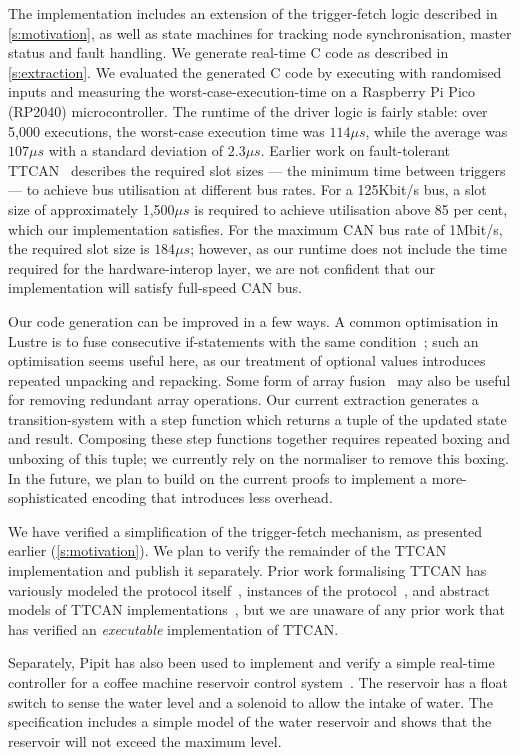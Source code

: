 The implementation includes an extension of the trigger-fetch logic described in \autoref{s:motivation}, as well as state machines for tracking node synchronisation, master status and fault handling.
We generate real-time C code as described in \autoref{s:extraction}.
We evaluated the generated C code by executing with randomised inputs and measuring the worst-case-execution-time on a Raspberry Pi Pico (RP2040) microcontroller.
The runtime of the driver logic is fairly stable: over 5,000 executions, the worst-case execution time was $114\mu{}s$, while the average was $107\mu{}s$ with a standard deviation of $2.3\mu{}s$.
Earlier work on fault-tolerant TTCAN~\cite{short2007fault} describes the required slot sizes --- the minimum time between triggers --- to achieve bus utilisation at different bus rates.
For a 125Kbit/s bus, a slot size of approximately 1,500$\mu{}s$ is required to achieve utilisation above 85 per cent, which our implementation satisfies.
For the maximum CAN bus rate of 1Mbit/s, the required slot size is $184\mu{}s$; however, as our runtime does not include the time required for the hardware-interop layer, we are not confident that our implementation will satisfy full-speed CAN bus.

Our code generation can be improved in a few ways.
A common optimisation in Lustre is to fuse consecutive if-statements with the same condition~\cite{bourke2017formally}; such an optimisation seems useful here, as our treatment of optional values introduces repeated unpacking and repacking.
Some form of array fusion~\cite{robinson2017machine} may also be useful for removing redundant array operations.
Our current extraction generates a transition-system with a step function which returns a tuple of the updated state and result.
Composing these step functions together requires repeated boxing and unboxing of this tuple; we currently rely on the \fstar{} normaliser to remove this boxing.
In the future, we plan to build on the current proofs to implement a more-sophisticated encoding that introduces less overhead.


We have verified a simplification of the trigger-fetch mechanism, as presented earlier (\autoref{s:motivation}).
We plan to verify the remainder of the TTCAN implementation and publish it separately.
Prior work formalising TTCAN has variously modeled the protocol itself~\cite{saha2007finite, pan2014modeling,li2018formal},
instances of the protocol~\cite{guo2020model},
and abstract models of TTCAN implementations~\cite{leen2006modeling}, but we are unaware of any prior work that has verified an \emph{executable} implementation of TTCAN.

Separately, Pipit has also been used to implement and verify a simple real-time controller for a coffee machine reservoir control system~\cite{robinson2023pipit}.
The reservoir has a float switch to sense the water level and a solenoid to allow the intake of water.
The specification includes a simple model of the water reservoir and shows that the reservoir will not exceed the maximum level.
